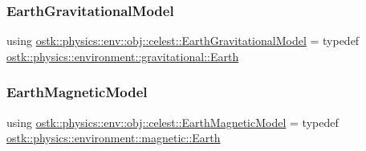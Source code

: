 \subsubsection{\texorpdfstring{Earth\+Gravitational\+Model}{EarthGravitationalModel}}
{\footnotesize\ttfamily using \hyperlink{namespaceostk_1_1physics_1_1env_1_1obj_1_1celest_afb7c5d16d89de6cfcf563f89088f69c5}{ostk\+::physics\+::env\+::obj\+::celest\+::\+Earth\+Gravitational\+Model} = typedef \hyperlink{classostk_1_1physics_1_1environment_1_1gravitational_1_1_earth}{ostk\+::physics\+::environment\+::gravitational\+::\+Earth}}

\mbox{\label{namespaceostk_1_1physics_1_1env_1_1obj_1_1celest_ac56a1ac811d11e06caa66c76debac944}} 
\subsubsection{\texorpdfstring{Earth\+Magnetic\+Model}{EarthMagneticModel}}
{\footnotesize\ttfamily using \hyperlink{namespaceostk_1_1physics_1_1env_1_1obj_1_1celest_ac56a1ac811d11e06caa66c76debac944}{ostk\+::physics\+::env\+::obj\+::celest\+::\+Earth\+Magnetic\+Model} = typedef \hyperlink{classostk_1_1physics_1_1environment_1_1magnetic_1_1_earth}{ostk\+::physics\+::environment\+::magnetic\+::\+Earth}}

